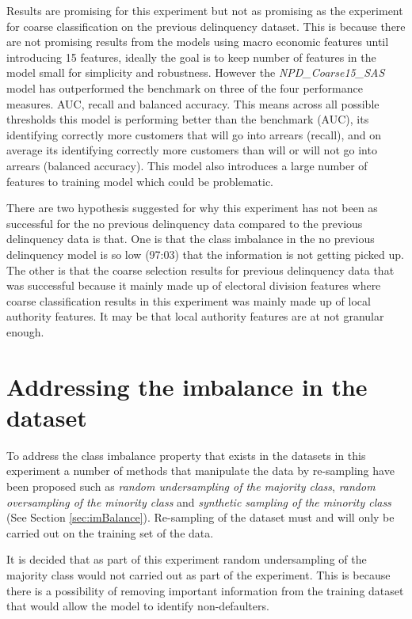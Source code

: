 Results are promising for this experiment but not as promising as the experiment for coarse classification on the previous delinquency dataset. This is because there are not promising results from the models using macro economic features until introducing 15 features, ideally the goal is to keep number of features in the model small for simplicity and robustness. However the \textit{NPD\_Coarse15\_SAS} model has outperformed the benchmark on three of the four performance measures. AUC, recall and balanced accuracy. This means across all possible thresholds this model is performing better than the benchmark (AUC), its identifying correctly more customers that will go into arrears (recall), and on average its identifying correctly more customers than will or will not go into arrears (balanced accuracy). This model also introduces a large number of features to training model which could be problematic. 

There are two hypothesis suggested for why this experiment has not been as successful for the no previous delinquency data compared to the previous delinquency data is that. One is that the class imbalance in the no previous delinquency model is so low (97:03) that the information is not getting picked up. The other is that the coarse selection results for previous delinquency data that was successful because it mainly made up of electoral division features where coarse classification results in this experiment was mainly made up of local authority features. It may be that local authority features are at not granular enough. 

\section{Addressing the imbalance in the dataset}
To address the class imbalance property that exists in the datasets in this experiment a number of methods that manipulate the data by re-sampling have been proposed such as \textit{random undersampling of the majority class}, \textit{random oversampling of the minority class} and \textit{synthetic sampling of the minority class} (See Section \ref{sec:imBalance}). Re-sampling of the dataset must and will only be carried out on the training set of the data.

It is decided that as part of this experiment random undersampling of the majority class would not carried out as part of the experiment. This is because there is a possibility of removing important information from the training dataset that would allow the model to identify non-defaulters.


